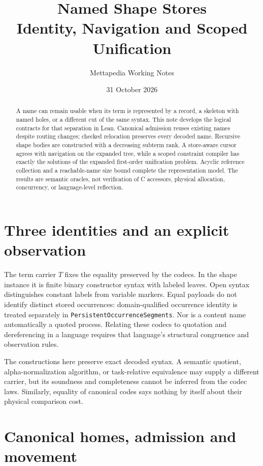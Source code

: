\documentclass[11pt,a4paper]{article}
\title{Named Shape Stores\\
  \large Identity, Navigation and Scoped Unification}
\author{Mettapedia Working Notes}
\date{31 October 2026}
\newcommand{\code}[1]{\nolinkurl{#1}}
\begin{document}
\maketitle

\begin{abstract}
A name can remain usable when its term is represented by a record, a skeleton
with named holes, or a different cut of the same syntax. This note develops
the logical contracts for that separation in Lean. Canonical admission reuses
existing names despite routing changes; checked relocation preserves every
decoded name. Recursive shape bodies are constructed with a decreasing
subterm rank. A store-aware cursor agrees with navigation on the expanded
tree, while a scoped constraint compiler has exactly the solutions of the
expanded first-order unification problem. Acyclic reference collection and a
reachable-name size bound complete the representation model. The results
are semantic oracles, not verification of C accessors, physical allocation,
concurrency, or language-level reflection.
\end{abstract}

\section{Three identities and an explicit observation}

The term carrier $T$ fixes the equality preserved by the codecs. In the shape
instance it is finite binary constructor syntax with labeled leaves. Open
syntax distinguishes constant labels from variable markers. Equal payloads
do not identify distinct stored occurrences: domain-qualified occurrence
identity is treated separately in \code{PersistentOccurrenceSegments}.
Nor is a content name automatically a quoted process. Relating these codecs
to quotation and dereferencing in a language requires that language's
structural congruence and observation rules.

The constructions here preserve exact decoded syntax. A semantic quotient,
alpha-normalization algorithm, or task-relative equivalence may supply a
different carrier, but its soundness and completeness cannot be inferred
from the codec laws. Similarly, equality of canonical codes says nothing by
itself about their physical comparison cost.

\section{Canonical homes, admission and movement}
\end{document}
